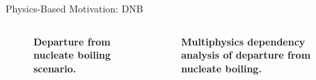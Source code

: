 \documentclass{beamer}
\begin{document}
\begin{frame}{Physics-Based Motivation: DNB}

  \begin{columns}

    \begin{column}{0.35\textwidth}
      \begin{figure}[htpb!]
        \begin{center}
          \scalebox{1}{  }
        \end{center}
        \caption{\textbf{Departure from nucleate boiling scenario.} }
      \end{figure}
    \end{column}

    \begin{column}{0.65\textwidth}
      \begin{figure}[htpb!]
        \begin{center}
          \scalebox{0.8}{  }
        \end{center}
        \caption{\textbf{Multiphysics dependency analysis of departure
            from nucleate boiling.} }
      \end{figure}
    \end{column}

  \end{columns}

\end{frame}
\end{document}
